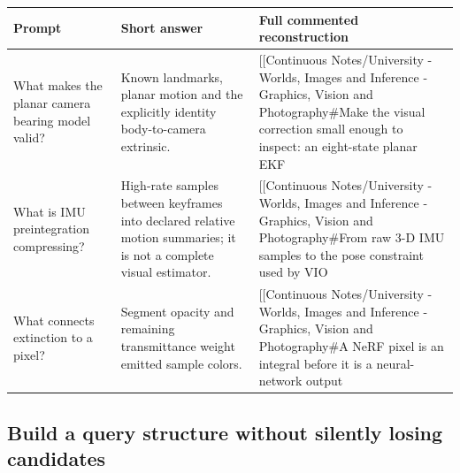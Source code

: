 {\def\LTcaptype{none} %
\begin{longtable}[]{@{}
  >{\raggedright\arraybackslash}p{}
  >{\raggedright\arraybackslash}p{}
  >{\raggedright\arraybackslash}p{}@{}}
\toprule\noalign{}
\begin{minipage}[b]{\linewidth}\raggedright
Prompt
\end{minipage} & \begin{minipage}[b]{\linewidth}\raggedright
Short answer
\end{minipage} & \begin{minipage}[b]{\linewidth}\raggedright
Full commented reconstruction
\end{minipage} \\
\midrule\noalign{}
\endhead
\bottomrule\noalign{}
\endlastfoot
What makes the planar camera bearing model valid? & Known landmarks, planar motion and the explicitly identity body-to-camera extrinsic. & {[}{[}Continuous Notes/University - Worlds, Images and Inference - Graphics, Vision and Photography\#Make the visual correction small enough to inspect: an eight-state planar EKF \\
What is IMU preintegration compressing? & High-rate samples between keyframes into declared relative motion summaries; it is not a complete visual estimator. & {[}{[}Continuous Notes/University - Worlds, Images and Inference - Graphics, Vision and Photography\#From raw 3-D IMU samples to the pose constraint used by VIO \\
What connects extinction to a pixel? & Segment opacity and remaining transmittance weight emitted sample colors. & {[}{[}Continuous Notes/University - Worlds, Images and Inference - Graphics, Vision and Photography\#A NeRF pixel is an integral before it is a neural-network output \\
\end{longtable}
}

\subsection{Build a query structure without silently losing candidates}\label{appendix-a8f634b076b5-build-a-query-structure-without-silently-losing-candidates}

\hypertarget{appendix-a8f634b076b5-build-a-query-structure-without-silently-losing-candidates}{}


